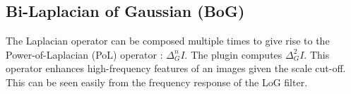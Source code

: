 \documentclass{amsart}
\begin{document}
\subsection{Bi-Laplacian of Gaussian (BoG)}
The Laplacian operator can be composed multiple times to give rise to the Power-of-Laplacian (PoL) operator \cite{Prodanov2015}:
$
\Delta_G^n I 
$.
The plugin computes $\Delta_G^2 I$.
This operator enhances high-frequency features of an images given the scale cut-off. 
This can be seen easily from the frequency response of the LoG filter.



\end{document}
